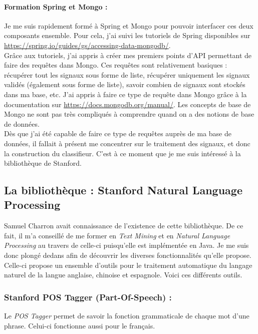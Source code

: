         \paragraph{Formation Spring et Mongo :}
            Je me suis rapidement formé à Spring et Mongo pour pouvoir interfacer ces deux composants ensemble. Pour cela, j'ai suivi les tutoriels de Spring disponibles sur \href{https://spring.io/guides/gs/accessing-data-mongodb/}{https://spring.io/guides/gs/accessing-data-mongodb/}.\\
            Grâce aux tutoriels, j'ai appris à créer mes premiers points d'API permettant de faire des requêtes dans Mongo. Ces requêtes sont relativement basiques : récupérer tout les signaux sous forme de liste, récupérer uniquement les signaux validés (également sous forme de liste), savoir combien de signaux sont stockés dans ma base, etc. J'ai appris à faire ce type de requête dans Mongo grâce à la documentation sur \href{https://docs.mongodb.org/manual/}{https://docs.mongodb.org/manual/}. Les concepts de base de Mongo ne sont pas très compliqués à comprendre quand on a des notions de base de données.\\

        Dès que j'ai été capable de faire ce type de requêtes auprès de ma base de données, il fallait à présent me concentrer sur le traitement des signaux, et donc la construction du classifieur. C'est à ce moment que je me suis intéressé à la bibliothèque de Stanford.

        \subsection{La bibliothèque : Stanford Natural Language Processing}
            Samuel Charron avait connaissance de l'existence de cette bibliothèque. De ce fait, il m'a conseillé de me former en \textit{Text Mining} et en \textit{Natural Language Processing} au travers de celle-ci puisqu'elle est implémentée en Java. Je me suis donc plongé dedans afin de découvrir les diverses fonctionnalités qu'elle propose. Celle-ci propose un ensemble d'outils pour le traitement automatique du langage naturel de la langue anglaise, chinoise et espagnole. Voici ces différents outils.

            \subsubsection{Stanford POS Tagger (Part-Of-Speech) :}
                Le \textit{POS Tagger} permet de savoir la fonction grammaticale de chaque mot d'une phrase. Celui-ci fonctionne aussi pour le français.

